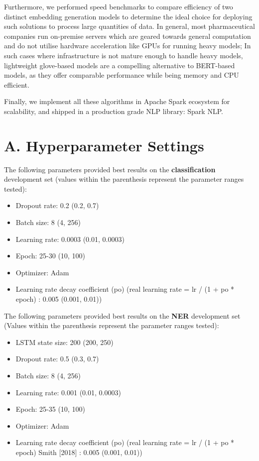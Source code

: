 \documentclass[letterpaper]{article}
\begin{document}
Furthermore, we performed speed benchmarks to compare efficiency of two distinct embedding generation models to determine the ideal choice for deploying such solutions to process large quantities of data. In general, most pharmaceutical companies run on-premise servers which are geared towards general computation and do not utilise hardware acceleration like GPUs for running heavy models; In such cases where infrastructure is not mature enough to handle heavy models, lightweight glove-based models are a compelling alternative to BERT-based models, as they offer comparable performance while being memory and CPU efficient.

Finally, we implement all these algorithms in Apache Spark ecosystem for scalability, and shipped in a production grade NLP library: Spark NLP.

\appendix
\section{A. Hyperparameter Settings}

The following parameters provided best results on the \textbf{classification} development set (values within the parenthesis represent the
parameter ranges tested):
\begin{itemize}
    \item Dropout rate: 0.2 (0.2, 0.7)
    \item Batch size: 8 (4, 256)
    \item Learning rate: 0.0003 (0.01, 0.0003)
    \item Epoch: 25-30 (10, 100)
    \item Optimizer: Adam
    \item Learning rate decay coefficient (po) (real learning rate =
lr / (1 + po * epoch) : 0.005 (0.001, 0.01))
\end{itemize}

The following parameters provided best results on the \textbf{NER} development set (Values within the parenthesis represent the parameter ranges tested):
\begin{itemize}
        \item LSTM state size: 200 (200, 250)
        \item Dropout rate: 0.5 (0.3, 0.7)
        \item Batch size: 8 (4, 256)
        \item Learning rate: 0.001 (0.01, 0.0003)
        \item Epoch: 25-35 (10, 100)
        \item Optimizer: Adam
        \item Learning rate decay coefficient (po) (real learning rate =
    lr / (1 + po * epoch) Smith [2018] : 0.005 (0.001, 0.01))
\end{itemize}
\end{document}
